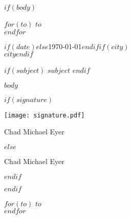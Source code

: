 \documentclass[$fontsize$, letter]{article}
\begin{document}
$if(body)$

\small

\vspace{1em}

\normalsize \sffamily
$for(to)$
\textsc{\lowercase{$to$}}\\
$endfor$

\vspace{3em}

\rmfamily
\begin{flushright}
  $if(date)$$else$\today$endif$$if(city)$\\$city$$endif$
\end{flushright}

\vspace{1em}

$if(subject)$
\textbf{$subject$}
$endif$

\vspace{1em}

$body$

$if(signature)$
{
    \begin{FlushRight}  	\parbox[t]{0.6in}{\texttt{[image: signature.pdf]}}
    \vspace*{-3\baselineskip}Chad Michael Eyer
    \end{FlushRight}
}
$else$
    \begin{FlushRight}
    \vspace*{2.875\baselineskip}Chad Michael Eyer
    \end{FlushRight}
$endif$

\clearpage

$endif$


$for(to)$
\large\textocr\uppercase{$to$}\\
$endfor$
\end{document}
